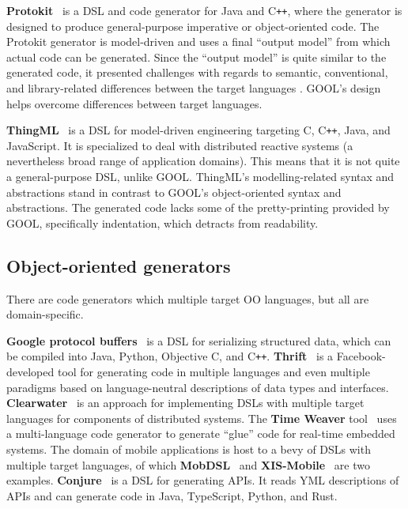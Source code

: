 \documentclass[sigplan,screen,10pt]{acmart}
\newcommand{\Cplusplus}{C\texttt{++}}
\begin{document}
\textbf{Protokit}~\cite{kovesdan2017multi} is a DSL and code generator for Java and
\Cplusplus, where the generator is designed to produce
general-purpose imperative or object-oriented code. The Protokit generator is
model-driven and uses a final ``output model'' from which actual code can be
generated. Since the ``output model'' is quite similar to the generated
code, it presented challenges with regards to semantic, conventional, and
library-related differences between the target languages
\cite{kovesdan2017multi}. GOOL's design helps overcome differences between
target languages.

\textbf{ThingML}~\cite{harrand2016thingml} is a DSL for model-driven engineering
targeting C, \Cplusplus, Java, and JavaScript. It is specialized to deal with
distributed reactive systems (a nevertheless broad range of application domains).
This means that it is not quite a general-purpose DSL, unlike GOOL.
ThingML's modelling-related syntax and abstractions stand in contrast to GOOL's
object-oriented syntax and abstractions. The generated code lacks some of the
pretty-printing provided by GOOL, specifically indentation, which detracts from
readability.

\subsection{Object-oriented generators}

There are code generators which multiple target OO languages, but all are
domain-specific.

\textbf{Google protocol buffers}~\cite{Protobuf} is a DSL for serializing
structured data, which can be compiled into Java, Python, Objective C, and
\Cplusplus.  \textbf{Thrift}~\cite{slee2007thrift} is a Facebook-developed tool
for generating code in multiple languages and even multiple paradigms based on
language-neutral descriptions of data types and interfaces.
\textbf{Clearwater}~\cite{swint2005clearwater} is an approach for implementing
DSLs with multiple target languages for components of distributed systems.  The
\textbf{Time Weaver} tool~\cite{de2004glue} uses a multi-language code
generator to generate ``glue'' code for real-time embedded systems.  The domain
of mobile applications is host to a bevy of DSLs with multiple target
languages, of which \textbf{MobDSL}~\cite{kramer2010mobdsl} and
\textbf{XIS-Mobile}~\cite{ribeiro2014xis} are two examples.
\textbf{Conjure}~\cite{Conjure} is a DSL for generating APIs. It reads YML
descriptions of APIs and can generate code in Java, TypeScript, Python, and
Rust.
\end{document}
